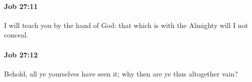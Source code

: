 		\paragraph{Job 27:11} %
			\label{JOB-27-11}

			I will teach you by the hand of God: that which is with the Almighty will I not conceal.


		\paragraph{Job 27:12} %
			\label{JOB-27-12}

			Behold, all ye yourselves have seen it; why then are ye thus altogether vain?


